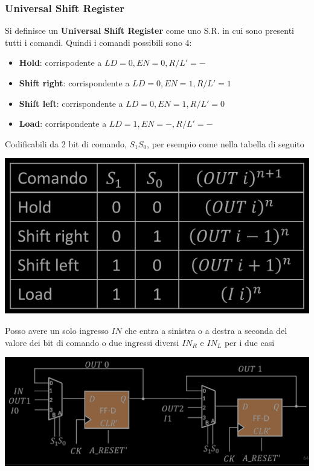\documentclass{article}
\begin{document}
\subsubsection{Universal Shift Register}
Si definisce un \textbf{\color{cyan}Universal Shift Register} come uno S.R. in cui sono presenti tutti i comandi.
Quindi i comandi possibili sono 4:
\begin{itemize}
    \item \textbf{Hold}: corrispodente a $LD=0, EN=0, R/L'=-$
    \item \textbf{Shift right}: corrispondente a $LD=0, EN=1, R/L'=1$
    \item \textbf{Shift left}: corrispondente a $LD=0, EN=1, R/L'=0$
    \item \textbf{Load}: corrispondente a $LD=1, EN=-, R/L'=-$
\end{itemize}
Codificabili da 2 bit di comando, $S_1 S_0$, per esempio come nella tabella di seguito
\begin{center}
    \includegraphics[scale=0.35]{tabella s1 s0.png}
\end{center}
Posso avere un solo ingresso $IN$ che entra a sinistra o a destra a seconda del valore dei bit di comando o due ingressi diversi $IN_R$ e $IN_L$ per i due casi
\begin{center}
    \includegraphics[scale=0.35]{uni shift register.png}
\end{center}
\end{document}
